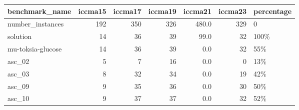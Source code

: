 \begin{tabular}{lrrrrrl}
\toprule
benchmark\_name &  iccma15 &  iccma17 &  iccma19 &  iccma21 &  iccma23 & percentage \\
\midrule
number\_instances  &      192 &      350 &      326 &    480.0 &      329 &          0 \\
solution          &       14 &       36 &       39 &     99.0 &       32 &       100\% \\
mu-toksia-glucose &       14 &       36 &       39 &      0.0 &       32 &        55\% \\
asc\_02            &        5 &        7 &       16 &      0.0 &        0 &        13\% \\
asc\_03            &        8 &       32 &       34 &      0.0 &       19 &        42\% \\
asc\_09            &        9 &       35 &       36 &      0.0 &       30 &        50\% \\
asc\_10            &        9 &       37 &       37 &      0.0 &       32 &        52\% \\
\bottomrule
\end{tabular}

